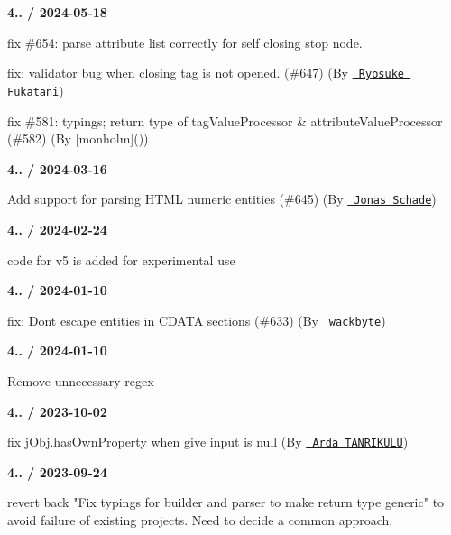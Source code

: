 {\bfseries{4.. / 2024-\/05-\/18}}
\begin{DoxyItemize}
\item fix \#654\+: parse attribute list correctly for self closing stop node.
\item fix\+: validator bug when closing tag is not opened. (\#647) (By \href{https://github.com/RyosukeFukatani}{\texttt{ Ryosuke Fukatani}})
\item fix \#581\+: typings; return type of {\ttfamily tag\+Value\+Processor} \& {\ttfamily attribute\+Value\+Processor} (\#582) (By \mbox{[}monholm\mbox{]}())
\end{DoxyItemize}

{\bfseries{4.. / 2024-\/03-\/16}}
\begin{DoxyItemize}
\item Add support for parsing HTML numeric entities (\#645) (By \href{https://github.com/DerZade}{\texttt{ Jonas Schade}})
\end{DoxyItemize}

{\bfseries{4.. / 2024-\/02-\/24}}
\begin{DoxyItemize}
\item code for v5 is added for experimental use
\end{DoxyItemize}

{\bfseries{4.. / 2024-\/01-\/10}}
\begin{DoxyItemize}
\item fix\+: Don\textquotesingle{}t escape entities in CDATA sections (\#633) (By \href{https://github.com/wackbyte}{\texttt{ wackbyte}})
\end{DoxyItemize}

{\bfseries{4.. / 2024-\/01-\/10}}
\begin{DoxyItemize}
\item Remove unnecessary regex
\end{DoxyItemize}

{\bfseries{4.. / 2023-\/10-\/02}}
\begin{DoxyItemize}
\item fix {\ttfamily j\+Obj.\+has\+Own\+Property} when give input is null (By \href{https://github.com/ardatan}{\texttt{ Arda TANRIKULU}})
\end{DoxyItemize}

{\bfseries{4.. / 2023-\/09-\/24}}
\begin{DoxyItemize}
\item revert back "{}\+Fix typings for builder and parser to make return type generic"{} to avoid failure of existing projects. Need to decide a common approach.
\end{DoxyItemize}

